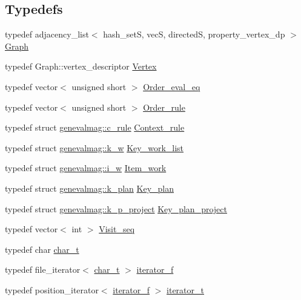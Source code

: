 \subsection*{Typedefs}
\begin{DoxyCompactItemize}
\item 
typedef adjacency\_\-list$<$ hash\_\-setS, vecS, directedS, property\_\-vertex\_\-dp $>$ \hyperlink{namespacegenevalmag_a4a96de9ebfc7d48233406ab9cad55cb5}{Graph}
\item 
typedef Graph::vertex\_\-descriptor \hyperlink{namespacegenevalmag_a2aae7b018fc2a9afae131bbf639181b5}{Vertex}
\item 
typedef vector$<$ unsigned short $>$ \hyperlink{namespacegenevalmag_a0bb2e8b0fa1b07b873f0363719de7b64}{Order\_\-eval\_\-eq}
\item 
typedef vector$<$ unsigned short $>$ \hyperlink{namespacegenevalmag_aed20da32fb9692645ae53d911d274fd5}{Order\_\-rule}
\item 
typedef struct \hyperlink{structgenevalmag_1_1c__rule}{genevalmag::c\_\-rule} \hyperlink{namespacegenevalmag_a59ad19d59075a158ceb18d55009ce9a7}{Context\_\-rule}
\item 
typedef struct \hyperlink{structgenevalmag_1_1k__w}{genevalmag::k\_\-w} \hyperlink{namespacegenevalmag_a457ae083d404303792f6086cf82a1c59}{Key\_\-work\_\-list}
\item 
typedef struct \hyperlink{structgenevalmag_1_1i__w}{genevalmag::i\_\-w} \hyperlink{namespacegenevalmag_abb601d42781f0764762a8e5a8ded19c6}{Item\_\-work}
\item 
typedef struct \hyperlink{structgenevalmag_1_1k__plan}{genevalmag::k\_\-plan} \hyperlink{namespacegenevalmag_a9cb3d5a3c6e368bf7a12efbc09f71048}{Key\_\-plan}
\item 
typedef struct \hyperlink{structgenevalmag_1_1k__p__project}{genevalmag::k\_\-p\_\-project} \hyperlink{namespacegenevalmag_ace502fedfb5a14e31d5d20b0d35b807d}{Key\_\-plan\_\-project}
\item 
typedef vector$<$ int $>$ \hyperlink{namespacegenevalmag_a7720677d79b33ecca4db21cdbcf7908f}{Visit\_\-seq}
\item 
typedef char \hyperlink{namespacegenevalmag_a63d49b2e7b123ae54a8fdc03bcbde116}{char\_\-t}
\item 
typedef file\_\-iterator$<$ \hyperlink{namespacegenevalmag_a63d49b2e7b123ae54a8fdc03bcbde116}{char\_\-t} $>$ \hyperlink{namespacegenevalmag_a068de0c39bd97e0f3fe3e3c805632e4b}{iterator\_\-f}
\item 
typedef position\_\-iterator$<$ \hyperlink{namespacegenevalmag_a068de0c39bd97e0f3fe3e3c805632e4b}{iterator\_\-f} $>$ \hyperlink{namespacegenevalmag_a64946721fb97e58be670a468bf8e7056}{iterator\_\-t}
\end{DoxyCompactItemize}
